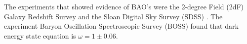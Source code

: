 \documentclass[onecolumn,           %
               showpacs,            %
               preprintnumbers,     %
               aps,                 %
               prl,          	    %
               letterpaper,             %
               superscriptaddress,      %
               nofootinbib,         %
               tightenlines,        %
               floats,floatfix      %
               ,usenatbib,
               ]{revtex4-1}
\begin{document}
The experiments that showed evidence of BAO's were the 2-degree Field (2dF) Galaxy Redshift Survey \cite{BAO3} and the Sloan Digital Sky Survey (SDSS) \cite{BAO4}. The experiment Baryon Oscillation Spectroscopic Survey (BOSS) found that dark energy state equation is $\omega = 1 \pm 0.06$.


%
%
\end{document}
